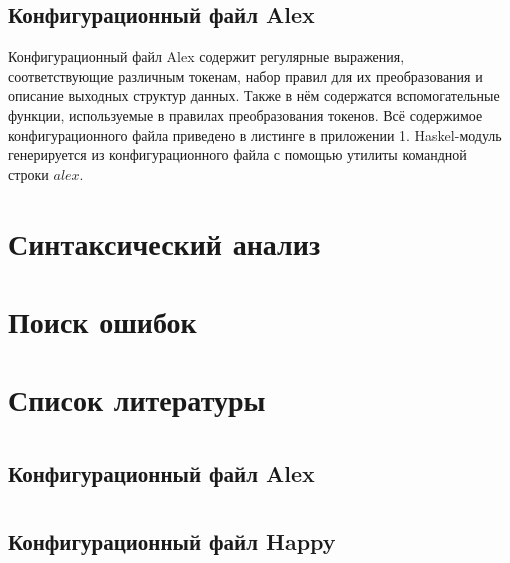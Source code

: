 \documentclass[a4paper,12pt]{report}
\numberwithin{equation}{section}
\begin{document}
\subsection{Конфигурационный файл Alex}
Конфигурационный файл Alex содержит регулярные выражения, соответствующие различным токенам, набор правил для их преобразования и описание выходных структур данных.
Также в нём содержатся вспомогательные функции, используемые в правилах преобразования токенов.
Всё содержимое конфигурационного файла приведено в листинге в приложении 1.
Haskel-модуль генерируется из конфигурационного файла с помощью утилиты командной строки $alex$.

\section{Синтаксический анализ}

\section{Поиск ошибок}

\section{Список литературы}
\printbibliography[heading=none]


\section*{} 
\subsection*{Конфигурационный файл Alex}

\clearpage

\section*{} 
\subsection*{Конфигурационный файл Happy}

\clearpage

\section*{} 
\end{document}

